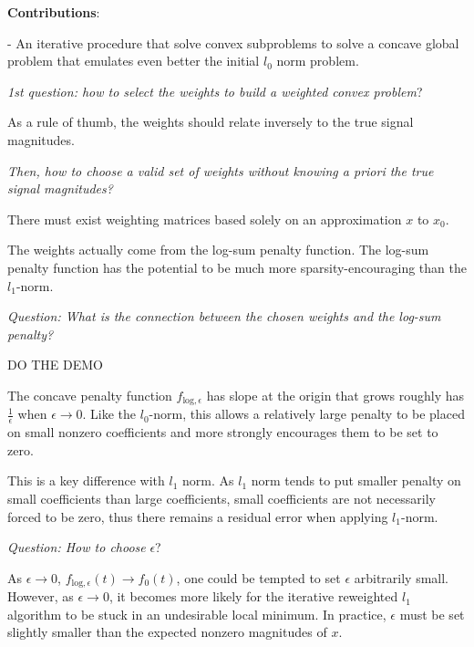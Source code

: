 \documentclass[a4paper,10pt]{article}
\theoremstyle{definition}
\begin{document}
\textbf{Contributions}:
\begin{list}{}{}
    \item - An iterative procedure that solve convex subproblems to solve a concave global problem that emulates even better the initial $l_0$ norm problem. 
\end{list}

\vskip 0.1in

\textit{1st question: how to select the weights to build a weighted convex problem}?

As a rule of thumb, the weights should relate inversely to the true signal magnitudes.

\textit{Then, how to choose a valid set of weights without knowing a priori the true signal magnitudes?}


There must exist weighting matrices based solely on an approximation $x$ to $x_0$. 

\vskip 0.1in

The weights actually come from the log-sum penalty function. The log-sum penalty function has the potential to be much more sparsity-encouraging than the $l_1$-norm.

\vskip 0.1in

\textit{Question: What is the connection between the chosen weights and the log-sum penalty?}

DO THE DEMO

\vskip 0.1in

The concave penalty function $f_{\text{log}, \epsilon}$ has slope at the origin that grows roughly has $\frac{1}{\epsilon}$ when $\epsilon \rightarrow 0$.
Like the $l_0$-norm, this allows a relatively large penalty to be placed on small nonzero coefficients and more strongly encourages them to be set to zero.

This is a key difference with $l_1$ norm. As $l_1$ norm tends to put smaller penalty on small coefficients than large coefficients, small coefficients are not
necessarily forced to be zero, thus there remains a residual error when applying $l_1$-norm.

\vskip 0.1in

\textit{Question: How to choose} $\epsilon$?

As $\epsilon \rightarrow 0$, $f_{\text{log}, \epsilon}(t) \rightarrow f_0(t)$, one could be tempted to set $\epsilon$ arbitrarily small. However, as $\epsilon \rightarrow 0$,
it becomes more likely for the iterative reweighted $l_1$ algorithm to be stuck in an undesirable local minimum.
In practice, $\epsilon$ must be set slightly smaller than the expected nonzero magnitudes of $x$.
\end{document}
